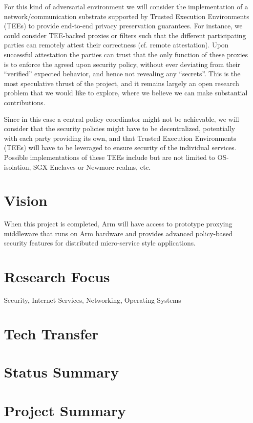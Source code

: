 \documentclass[a4paper]{article}
\begin{document}
\begin{enumerate}
  For this kind of adversarial environment we will consider the
  implementation of a network/communication substrate supported by
  Trusted Execution Environments (TEEs) to provide end-to-end privacy
  preservation guarantees.
  For instance, we could consider TEE-backed proxies or filters such
  that the different participating parties can remotely attest their
  correctness (cf. remote attestation).
  Upon successful attestation the parties can trust that the only
  function of these proxies is to enforce the agreed upon security
  policy, without ever deviating from their ``verified'' expected
  behavior, and hence not revealing any ``secrets''. 
  This is the most speculative thrust of the project, and it remains
  largely an open research problem that we would like to explore,
  where we believe we can make substantial contributions. 

  Since in this case a central policy coordinator might not be
  achievable, we will consider that the security policies might have to
  be decentralized, potentially with each party providing its own, and
  that Trusted Execution Environments (TEEs) will have to be leveraged
  to ensure security of the individual services.
  Possible implementations of these TEEs include but are not limited
  to OS-isolation, SGX Enclaves or Newmore realms, etc.
\end{enumerate}

\section{Vision}

When this project is completed, Arm will have access to prototype
proxying middleware that runs on Arm hardware and provides advanced
policy-based security features for distributed micro-service style
applications.

\section{Research Focus}

Security, Internet Services, Networking, Operating Systems 

\section{Tech Transfer}

\section{Status Summary}

\section{Project Summary}


\end{document}

